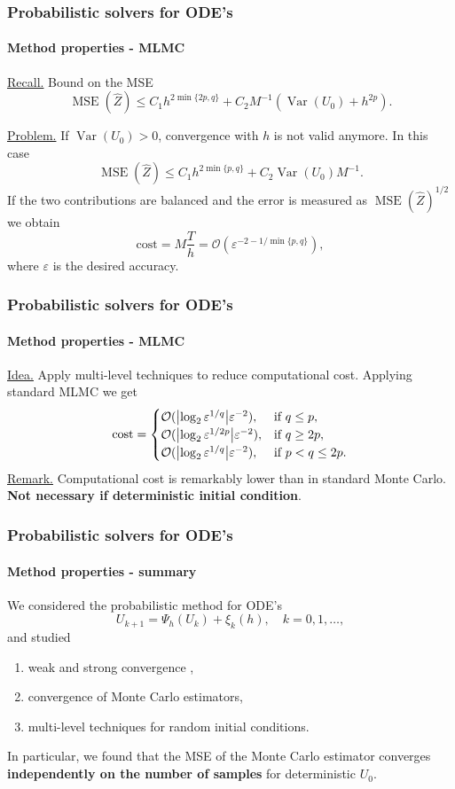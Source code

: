 \documentclass{beamer}
\newcommand{\epl}{\varepsilon}
\newcommand{\MSE}{\operatorname{MSE}}
\newcommand{\Var}{\operatorname{Var}}
\newcommand{\OO}{\mathcal{O}}
\begin{document}
\begin{frame}
	\frametitle{Probabilistic solvers for ODE's}
	\framesubtitle{Method properties - MLMC}
	
	\underline{Recall.} Bound on the MSE
	\begin{equation*}
		\MSE(\hat Z) \leq C_1 h^{2\min\{2p, q\}} + C_2 M^{-1} (\Var(U_0) + h^{2p}).
	\end{equation*}	
	
	\underline{Problem.} If $\Var(U_0) > 0$, convergence with $h$ is not valid anymore. In this case
	\begin{equation*}
		\MSE(\hat Z) \leq C_1 h^{2\min\{p, q\}} + C_2 \Var(U_0) M^{-1}.
	\end{equation*}	
	If the two contributions are balanced and the error is measured as $\MSE(\hat Z)^{1/2}$ we obtain
	\begin{equation*}
		\mathrm{cost} = M \frac{T}{h} = \OO\left(\epl^{-2 - 1/\min\{p, q\}}\right),
	\end{equation*}
	where $\epl$ is the desired accuracy.
\end{frame}

\begin{frame}
	\frametitle{Probabilistic solvers for ODE's}
	\framesubtitle{Method properties - MLMC}	

	\underline{Idea.} Apply multi-level techniques to reduce computational cost. Applying standard MLMC \cite{Gil08} we get
	\begin{equation*}
	\mathrm{cost} = \begin{cases}	\OO(\abs{\log_2\epl^{1/q}}\epl^{-2}), & \text{if } q \leq p, \\
						   	\OO(\abs{\log_2\epl^{1/2p}}\epl^{-2}), & \text{if } q \geq 2p, \\	
						   	\OO(\abs{\log_2\epl^{1/q}}\epl^{-2}), & \text{if } p < q \leq 2p. \\	
			\end{cases}
	\end{equation*}	
	\underline{Remark.} Computational cost is remarkably lower than in standard Monte Carlo. \textbf{Not necessary if deterministic initial condition}.
\end{frame}

\begin{frame}
	\frametitle{Probabilistic solvers for ODE's}
	\framesubtitle{Method properties - summary}
	
	We considered the probabilistic method for ODE's
	\begin{equation*}
		U_{k+1} = \Psi_h(U_k) + \xi_k(h), \quad k = 0, 1, \ldots,
	\end{equation*}
	and studied
	\begin{enumerate}
		\item weak and strong convergence \cite{CGS16},
		\item convergence of Monte Carlo estimators,
		\item multi-level techniques for random initial conditions.
	\end{enumerate}
	In particular, we found that the MSE of the Monte Carlo estimator converges \textbf{independently on the number of samples} for deterministic $U_0$.
\end{frame}
\end{document}
